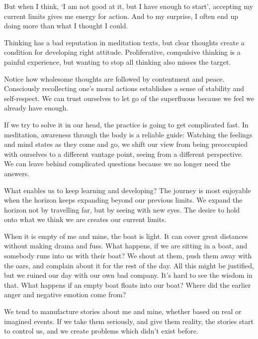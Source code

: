 \clearpage


But when I think, `I am not good at it, but I have enough to start',
accepting my current limits gives me energy for action. And to my
surprise, I often end up doing more than what I thought I could.

Thinking has a bad reputation in meditation texts, but clear thoughts
create a condition for developing right attitude. Proliferative,
compulsive thinking is a painful experience, but wanting to stop all
thinking also misses the target.

Notice how wholesome thoughts are followed by contentment and peace.
Consciously recollecting one's moral actions establishes a sense of
stability and self-respect. We can trust ourselves to let go of the
superfluous because we feel we already have enough.

If we try to solve it in our head, the practice is going to get
complicated fast. In meditation, awareness through the body is a
reliable guide: Watching the feelings and mind states as they come and
go, we shift our view from being preoccupied with ourselves to a
different vantage point, seeing from a different perspective. We can
leave behind complicated questions because we no longer need the
answers.


What enables us to keep learning and developing? The journey is most
enjoyable when the horizon keeps expanding beyond our previous limits.
We expand the horizon not by travelling far, but by seeing with new
eyes. The desire to hold onto what we think we are creates our current
limits.

When it is empty of me and mine, the boat is light. It can cover great
distances without making drama and fuss. What happens, if we are sitting
in a boat, and somebody runs into us with their boat? We shout at them,
push them away with the oars, and complain about it for the rest of the
day. All this might be justified, but we ruined our day with our own bad
company. It's hard to see the wisdom in that. What happens if an empty
boat floats into our boat? Where did the earlier anger and negative
emotion come from?

We tend to manufacture stories about me and mine, whether based on real
or imagined events. If we take them seriously, and give them reality,
the stories start to control us, and we create problems which didn't
exist before.

